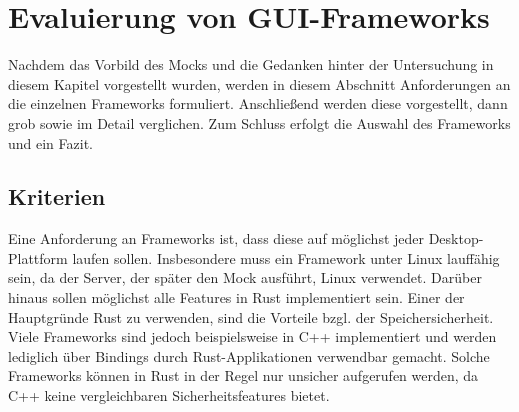 
\section{Evaluierung von GUI-Frameworks}
\label{sec:gui-eval}
Nachdem das Vorbild des Mocks und die Gedanken hinter der Untersuchung in diesem Kapitel vorgestellt wurden, werden in diesem Abschnitt Anforderungen an die einzelnen Frameworks formuliert. Anschließend werden diese vorgestellt, dann grob sowie im Detail verglichen. Zum Schluss erfolgt die Auswahl des Frameworks und ein Fazit.

\subsection{Kriterien}
\label{subsec:criteria}

Eine Anforderung an Frameworks ist, dass diese auf möglichst jeder Desktop-Plattform laufen sollen. Insbesondere muss ein Framework unter Linux lauffähig sein, da der Server, der später den Mock ausführt, Linux verwendet. Darüber hinaus sollen möglichst alle Features in Rust implementiert sein. Einer der Hauptgründe Rust zu verwenden, sind die Vorteile bzgl. der Speichersicherheit. Viele Frameworks sind jedoch beispielsweise in C++ implementiert und werden lediglich über Bindings durch Rust-Applikationen verwendbar gemacht. Solche Frameworks können in Rust in der Regel nur unsicher aufgerufen werden, da C++ keine vergleichbaren Sicherheitsfeatures bietet.

